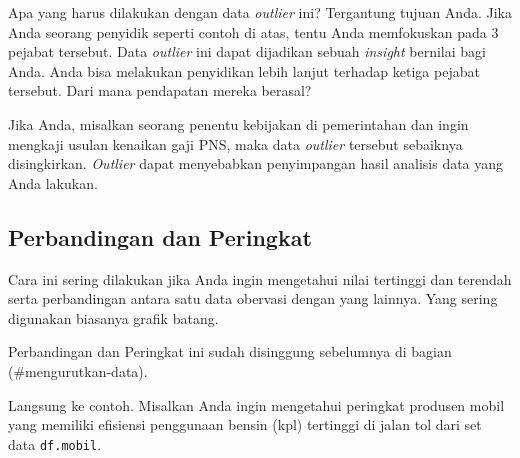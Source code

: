 \documentclass[openany]{book}
\newenvironment{Shaded}{\begin{snugshade}}{\end{snugshade}}
\newcommand{\KeywordTok}[1]{\textcolor[rgb]{0.13,0.29,0.53}{\textbf{#1}}}
\newcommand{\DataTypeTok}[1]{\textcolor[rgb]{0.13,0.29,0.53}{#1}}
\newcommand{\StringTok}[1]{\textcolor[rgb]{0.31,0.60,0.02}{#1}}
\newcommand{\CommentTok}[1]{\textcolor[rgb]{0.56,0.35,0.01}{\textit{#1}}}
\newcommand{\OperatorTok}[1]{\textcolor[rgb]{0.81,0.36,0.00}{\textbf{#1}}}
\newcommand{\NormalTok}[1]{#1}
\begin{document}
Apa yang harus dilakukan dengan data \emph{outlier} ini? Tergantung
tujuan Anda. Jika Anda seorang penyidik seperti contoh di atas, tentu
Anda memfokuskan pada 3 pejabat tersebut. Data \emph{outlier} ini dapat
dijadikan sebuah \emph{insight} bernilai bagi Anda. Anda bisa melakukan
penyidikan lebih lanjut terhadap ketiga pejabat tersebut. Dari mana
pendapatan mereka berasal?

Jika Anda, misalkan seorang penentu kebijakan di pemerintahan dan ingin
mengkaji usulan kenaikan gaji PNS, maka data \emph{outlier} tersebut
sebaiknya disingkirkan. \emph{Outlier} dapat menyebabkan penyimpangan
hasil analisis data yang Anda lakukan.

\subsection{Perbandingan dan
Peringkat}\label{perbandingan-dan-peringkat}

Cara ini sering dilakukan jika Anda ingin mengetahui nilai tertinggi dan
terendah serta perbandingan antara satu data obervasi dengan yang
lainnya. Yang sering digunakan biasanya grafik batang.

Perbandingan dan Peringkat ini sudah disinggung sebelumnya di bagian
(\#mengurutkan-data).

Langsung ke contoh. Misalkan Anda ingin mengetahui peringkat produsen
mobil yang memiliki efisiensi penggunaan bensin (kpl) tertinggi di jalan
tol dari set data \texttt{df.mobil}.

\begin{Shaded}
\end{Shaded}
\end{document}
